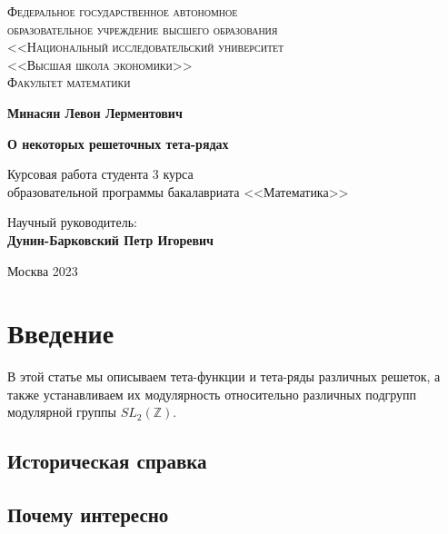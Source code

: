 \documentclass{article}
\title{}
\author{}
\newcommand{\ZZ}{\mathbb{Z}}
\theoremstyle{break}
\begin{document}
\begin{center}
	{\scshape Федеральное государственное автономное\\
		образовательное учреждение высшего образования\\
		<<Национальный исследовательский университет\\
		<<Высшая школа экономики>>\\[1ex]
		Факультет математики\par}
	
	\par\vfill
	
	\textbf{\large Минасян Левон Лерментович}
	
	\vspace{1.5cm}
	
	{\Large\bfseries
		О некоторых решеточных тета-рядах
		\par}
	
	\vspace{1.5cm}
	
	Курсовая работа студента 3 курса\\[1ex]
	образовательной программы бакалавриата <<Математика>>
	\par\vfill
	\noindent\hspace{0.52\textwidth}\parbox[t]{0.48\textwidth}{%
		Научный руководитель:\\[3pt]
		\textbf{Дунин-Барковский Петр Игоревич}\\[2ex]
	}%
	\par\vfill
	Москва 2023
\end{center}
\thispagestyle{empty}
\pagebreak

\section{Введение}
В этой статье мы описываем тета-функции и тета-ряды различных решеток, а также 
устанавливаем их модулярность относительно различных подгрупп модулярной группы
$SL_2(\ZZ)$.
\subsection{Историческая справка}

\subsection{Почему интересно}
\end{document}
